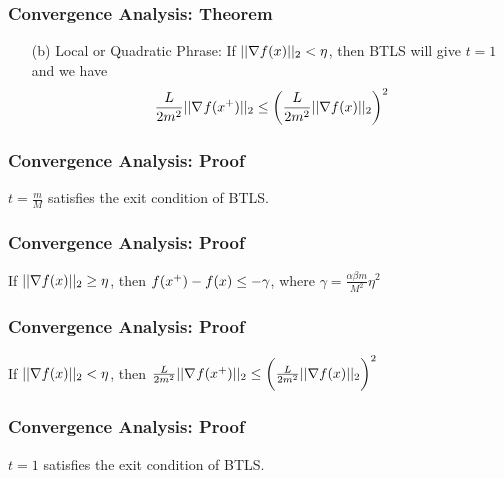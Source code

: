 \documentclass{beamer}
\newcommand{\be}{\begin{eqnarray}}
\newcommand{\ee}{\end{eqnarray}}
\begin{document}
\begin{frame}
    \frametitle{Convergence Analysis: Theorem}    
    \begin{theorem}[Part II]
        \begin{itemize}
            \item[(b)] Local or Quadratic Phrase: If $||\nabla f(x)||_2 < \eta$,
                then BTLS will give $t = 1$ and we have
                \be
                \frac{L}{2m^2} ||\gradient{}{f}{\xp}||_2 \leq 
                    \bigg(\frac{L}{2m^2} ||\fgrad||_2 \bigg)^2
                \ee
        \end{itemize}
    \end{theorem}
\end{frame}

\begin{frame}
    \frametitle{Convergence Analysis: Proof}    
    \begin{lemma}
        $t = \frac{m}{M}$ satisfies the exit condition of BTLS.
    \end{lemma}
\end{frame}

\begin{frame}
    \frametitle{Convergence Analysis: Proof}    
    \begin{lemma}
        If $||\nabla f(x)||_2 \geq \eta$, 
        then $f(x^{+}) - f(x) \leq -\gamma$, 
        where  $\gamma = \frac{\alpha \beta m}{M^2}\eta^2$

    \end{lemma}
\end{frame}

\begin{frame}
    \frametitle{Convergence Analysis: Proof}    
    \begin{lemma}
        If $||\nabla f(x)||_2 < \eta$, then 
        $ \frac{L}{2m^2} ||\nabla_{} f (x^{+})||_2 \leq
                \bigg(\frac{L}{2m^2} ||\nabla f(x)||_2 \bigg)^2 $

    \end{lemma}
\end{frame}

\begin{frame}
    \frametitle{Convergence Analysis: Proof}    
    \begin{lemma}
        $t = 1$ satisfies the exit condition of BTLS.
    \end{lemma}
\end{frame}
\iffalse
\end{document}
